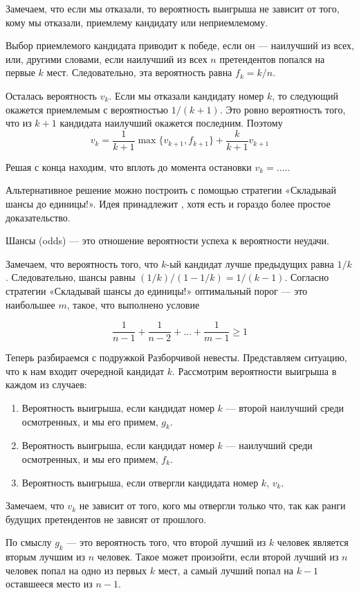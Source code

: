 \documentclass[nobib]{tufte-handout}
\theoremstyle{definition}
\newcounter{problem}
\newenvironment{problem}%
{%
\refstepcounter{problem}%
     \hypertarget{problem:{\theproblem}}{}
     \Writetofile{solution_file}{\protect\hypertarget{soln:\theproblem}{}}
     \begin{myenum}[label=\bfseries\protect\hyperlink{soln:\theproblem}{\theproblem},ref=\theproblem]
     \item%
    }%
    {%
    \end{myenum}}
\begin{document}
\begin{problem}
\begin{sol}
Замечаем, что если мы отказали, то вероятность выигрыша не зависит от того,
кому мы отказали, приемлему кандидату или неприемлемому.


Выбор приемлемого кандидата приводит к победе, если он — наилучший из всех, или,
другими словами, если наилучший из всех $n$ претендентов попался на первые $k$ мест.
Следовательно, эта вероятность равна $f_k = k/n$.

Осталась вероятность $v_k$. Если мы отказали кандидату номер $k$, то следующий
окажется приемлемым с вероятностью $1/(k+1)$. Это ровно вероятность того, что
из $k+1$ кандидата наилучший окажется последним. Поэтому
\[
v_k = \frac{1}{k+1} \max \{v_{k+1}, f_{k+1} \} + \frac{k}{k+1} v_{k+1}
\]

Решая с конца находим, что вплоть до момента остановки $v_k = ....$.


Альтернативное решение можно построить с помощью стратегии
«Складывай шансы до единицы!».
Идея принадлежит \cite{bruss2000sum}, хотя есть и гораздо более простое доказательство.

Шансы (odds) — это отношение вероятности успеха к вероятности неудачи.

Замечаем, что вероятность того, что $k$-ый кандидат лучше предыдущих равна $1/k$.
Следовательно, шансы равны $(1/k)/(1-1/k)=1/(k-1)$.
Согласно стратегии «Складывай шансы до единицы!»
оптимальный порог — это наибольшее $m$, такое, что выполнено условие

\[
\frac{1}{n-1} + \frac{1}{n-2} + \ldots + \frac{1}{m-1} \geq 1
\]


Теперь разбираемся с подружкой Разборчивой невесты. Представляем ситуацию, что к нам
входит очередной кандидат $k$. Рассмотрим вероятности выигрыша в каждом
из случаев:

\begin{enumerate}
  \item Вероятность выигрыша,
  если кандидат номер $k$ — второй наилучший среди осмотренных, и мы его примем, $g_k$.
  \item Вероятность выигрыша,
  если кандидат номер $k$ — наилучший среди осмотренных, и мы его примем, $f_k$.
  \item Вероятность выигрыша, если отвергли кандидата номер $k$, $v_k$.
\end{enumerate}

Замечаем, что $v_k$ не зависит от того, кого мы отвергли только что, так как ранги
будущих претендентов не зависят от прошлого.

По смыслу $g_k$ — это вероятность того, что второй лучший из $k$ человек является вторым
лучшим из $n$ человек. Такое может произойти, если второй лучший из $n$ человек попал
на одно из первых $k$ мест, а самый лучший попал на $k-1$ оставшееся место из $n-1$.


\end{sol}
\end{problem}
\end{document}
